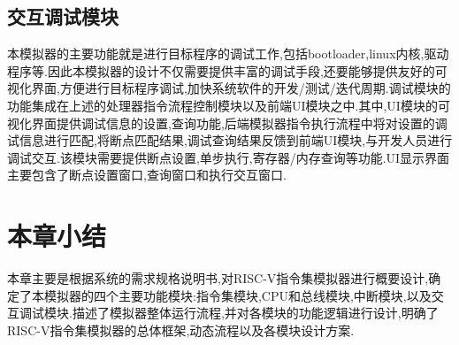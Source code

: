 \subsection{交互调试模块}
本模拟器的主要功能就是进行目标程序的调试工作,包括bootloader,linux内核,驱动程序等.因此本模拟器的设计不仅需要提供丰富的调试手段,还要能够提供友好的可视化界面,方便进行目标程序调试,加快系统软件的开发/测试/迭代周期.调试模块的功能集成在上述的处理器指令流程控制模块以及前端UI模块之中.其中,UI模块的可视化界面提供调试信息的设置,查询功能,后端模拟器指令执行流程中将对设置的调试信息进行匹配,将断点匹配结果,调试查询结果反馈到前端UI模块,与开发人员进行调试交互.该模块需要提供断点设置,单步执行,寄存器/内存查询等功能.UI显示界面主要包含了断点设置窗口,查询窗口和执行交互窗口.

\section{本章小结}
本章主要是根据系统的需求规格说明书,对RISC-V指令集模拟器进行概要设计,确定了本模拟器的四个主要功能模块:指令集模块,CPU和总线模块,中断模块,以及交互调试模块.描述了模拟器整体运行流程,并对各模块的功能逻辑进行设计,明确了RISC-V指令集模拟器的总体框架,动态流程以及各模块设计方案.